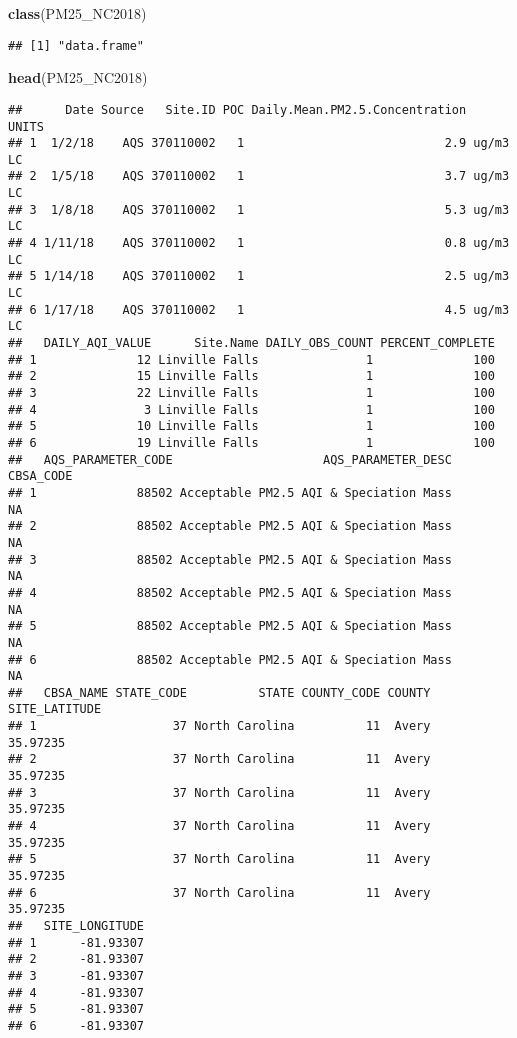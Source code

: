 \documentclass[]{article}
\newenvironment{Shaded}{\begin{snugshade}}{\end{snugshade}}
\newcommand{\KeywordTok}[1]{\textcolor[rgb]{0.13,0.29,0.53}{\textbf{#1}}}
\newcommand{\NormalTok}[1]{#1}
\begin{document}
\begin{Shaded}
\begin{Highlighting}[]
\KeywordTok{class}\NormalTok{(PM25_NC2018)}
\end{Highlighting}
\end{Shaded}

\begin{verbatim}
## [1] "data.frame"
\end{verbatim}

\begin{Shaded}
\begin{Highlighting}[]
\KeywordTok{head}\NormalTok{(PM25_NC2018)}
\end{Highlighting}
\end{Shaded}

\begin{verbatim}
##      Date Source   Site.ID POC Daily.Mean.PM2.5.Concentration    UNITS
## 1  1/2/18    AQS 370110002   1                            2.9 ug/m3 LC
## 2  1/5/18    AQS 370110002   1                            3.7 ug/m3 LC
## 3  1/8/18    AQS 370110002   1                            5.3 ug/m3 LC
## 4 1/11/18    AQS 370110002   1                            0.8 ug/m3 LC
## 5 1/14/18    AQS 370110002   1                            2.5 ug/m3 LC
## 6 1/17/18    AQS 370110002   1                            4.5 ug/m3 LC
##   DAILY_AQI_VALUE      Site.Name DAILY_OBS_COUNT PERCENT_COMPLETE
## 1              12 Linville Falls               1              100
## 2              15 Linville Falls               1              100
## 3              22 Linville Falls               1              100
## 4               3 Linville Falls               1              100
## 5              10 Linville Falls               1              100
## 6              19 Linville Falls               1              100
##   AQS_PARAMETER_CODE                     AQS_PARAMETER_DESC CBSA_CODE
## 1              88502 Acceptable PM2.5 AQI & Speciation Mass        NA
## 2              88502 Acceptable PM2.5 AQI & Speciation Mass        NA
## 3              88502 Acceptable PM2.5 AQI & Speciation Mass        NA
## 4              88502 Acceptable PM2.5 AQI & Speciation Mass        NA
## 5              88502 Acceptable PM2.5 AQI & Speciation Mass        NA
## 6              88502 Acceptable PM2.5 AQI & Speciation Mass        NA
##   CBSA_NAME STATE_CODE          STATE COUNTY_CODE COUNTY SITE_LATITUDE
## 1                   37 North Carolina          11  Avery      35.97235
## 2                   37 North Carolina          11  Avery      35.97235
## 3                   37 North Carolina          11  Avery      35.97235
## 4                   37 North Carolina          11  Avery      35.97235
## 5                   37 North Carolina          11  Avery      35.97235
## 6                   37 North Carolina          11  Avery      35.97235
##   SITE_LONGITUDE
## 1      -81.93307
## 2      -81.93307
## 3      -81.93307
## 4      -81.93307
## 5      -81.93307
## 6      -81.93307
\end{verbatim}
\end{document}
